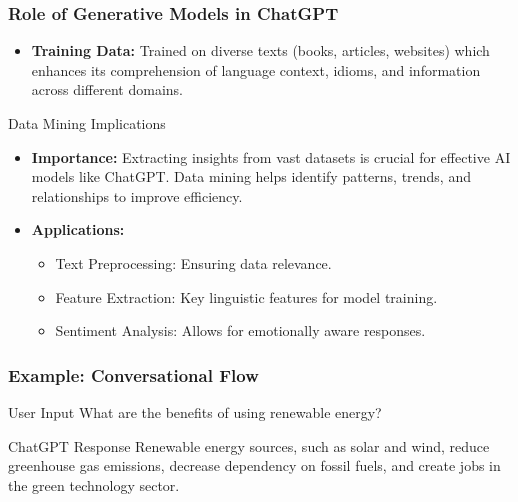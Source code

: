 \documentclass[aspectratio=169]{beamer}
\begin{document}
\begin{frame}[fragile]
    \frametitle{Role of Generative Models in ChatGPT}
    \begin{itemize}
        \item \textbf{Training Data:} Trained on diverse texts (books, articles, websites) which enhances its comprehension of language context, idioms, and information across different domains.
    \end{itemize}

    \begin{block}{Data Mining Implications}
        \begin{itemize}
            \item \textbf{Importance:} Extracting insights from vast datasets is crucial for effective AI models like ChatGPT. Data mining helps identify patterns, trends, and relationships to improve efficiency.
            \item \textbf{Applications:}
                \begin{itemize}
                    \item Text Preprocessing: Ensuring data relevance.
                    \item Feature Extraction: Key linguistic features for model training.
                    \item Sentiment Analysis: Allows for emotionally aware responses.
                \end{itemize}
        \end{itemize}
    \end{block}
\end{frame}

\begin{frame}[fragile]
    \frametitle{Example: Conversational Flow}
    \begin{block}{User Input}
        What are the benefits of using renewable energy?
    \end{block}
    \begin{block}{ChatGPT Response}
        Renewable energy sources, such as solar and wind, reduce greenhouse gas emissions, decrease dependency on fossil fuels, and create jobs in the green technology sector.
    \end{block}
\end{frame}
\end{document}
